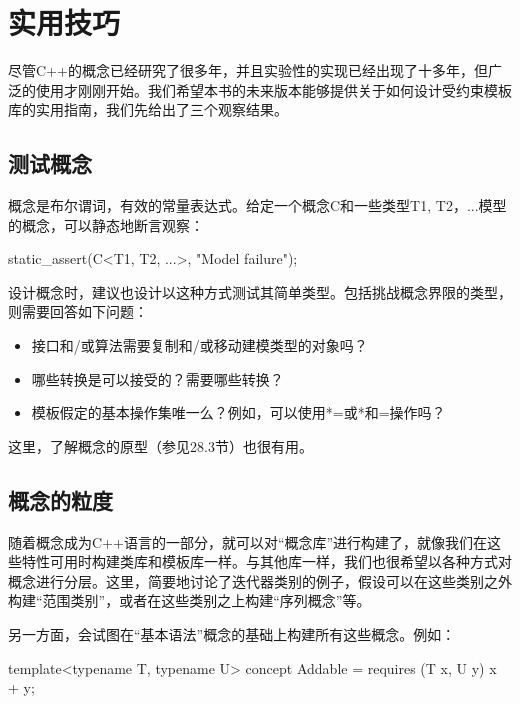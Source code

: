 \section{实用技巧}

尽管C++的概念已经研究了很多年，并且实验性的实现已经出现了十多年，但广泛的使用才刚刚开始。我们希望本书的未来版本能够提供关于如何设计受约束模板库的实用指南，我们先给出了三个观察结果。

\subsection{测试概念}

概念是布尔谓词，有效的常量表达式。给定一个概念C和一些类型T1, T2，...模型的概念，可以静态地断言观察：

\begin{cpp}
static_assert(C<T1, T2, ...>, "Model failure");
\end{cpp}

设计概念时，建议也设计以这种方式测试其简单类型。包括挑战概念界限的类型，则需要回答如下问题：

\begin{itemize}
\item 
接口和/或算法需要复制和/或移动建模类型的对象吗？

\item 
哪些转换是可以接受的？需要哪些转换？

\item 
模板假定的基本操作集唯一么？例如，可以使用*=或*和=操作吗？
\end{itemize}

这里，了解概念的原型（参见28.3节）也很有用。

\subsection{概念的粒度}

随着概念成为C++语言的一部分，就可以对“概念库”进行构建了，就像我们在这些特性可用时构建类库和模板库一样。与其他库一样，我们也很希望以各种方式对概念进行分层。这里，简要地讨论了迭代器类别的例子，假设可以在这些类别之外构建“范围类别”，或者在这些类别之上构建“序列概念”等。

另一方面，会试图在“基本语法”概念的基础上构建所有这些概念。例如：

\begin{cpp}
template<typename T, typename U>
concept Addable =
requires (T x, U y) {
	x + y;
}
\end{cpp}

